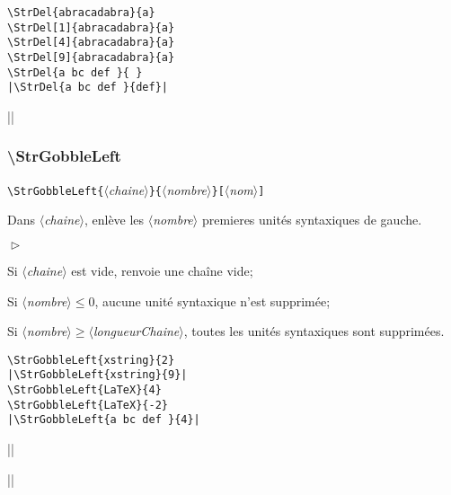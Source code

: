 \documentclass[a4paper,10pt]{article}
\newcommand\argu[1]{$\langle$\textit{#1}$\rangle$}
\newcommand\ARGU[1]{\texttt{\color{black}\{}\argu{#1}\texttt{\color{black}\}}}
\newcommand\arguC[1]{\texttt{\color{black}[}\argu{#1}\texttt{\color{black}]}}
\newenvironment{Conditions}[1][1cm]%
{\begin{list}%
	{$\vartriangleright$}%
	{\setlength{\leftmargin}{#1}
	 \setlength{\itemsep}{0pt}
	 \setlength{\parsep}{0pt}
	 \setlength{\topsep}{2ptplus3ptminus2pt}
	}}%
{\end{list}}
\newcommand\US{unité syntaxique\xspace}
\newcommand\USs{unités syntaxiques\xspace}
\newcommand\styleexemple{\small\vskip4pt}
\newcommand\verbinline{\lstinline[basicstyle=\normalsize\ttfamily]}
\begin{document}
\begin{minipage}[t]{0.65\linewidth}
\begin{lstlisting}
\StrDel{abracadabra}{a}
\StrDel[1]{abracadabra}{a}
\StrDel[4]{abracadabra}{a}
\StrDel[9]{abracadabra}{a}
\StrDel{a bc def }{ }
|\StrDel{a bc def }{def}|
\end{lstlisting}%
\end{minipage}\hfill
\begin{minipage}[t]{0.35\linewidth}
	\styleexemple
	\par
	\par
	\par
	\par
	\par
	||
\end{minipage}%

\subsubsection{\ttfamily\textbackslash StrGobbleLeft}
\verbinline|\StrGobbleLeft|\ARGU{chaine}\ARGU{nombre}\arguC{nom}
\smallskip

Dans \argu{chaine}, enlève les \argu{nombre} premieres \USs de gauche.\medskip

\begin{Conditions}
	\item Si \argu{chaine} est vide, renvoie une chaîne vide;
	\item Si \argu{nombre}${}\leqslant0$, aucune \US n'est supprimée;
	\item Si \argu{nombre}${}\geqslant{}$\argu{longueurChaine}, toutes les \USs sont supprimées.
\end{Conditions}

\begin{minipage}[t]{0.65\linewidth}
\begin{lstlisting}
\StrGobbleLeft{xstring}{2}
|\StrGobbleLeft{xstring}{9}|
\StrGobbleLeft{LaTeX}{4}
\StrGobbleLeft{LaTeX}{-2}
|\StrGobbleLeft{a bc def }{4}|
\end{lstlisting}%
\end{minipage}\hfill
\begin{minipage}[t]{0.35\linewidth}
	\styleexemple
	\par
	||\par
	\par
	\par
	||
\end{minipage}%
\end{document}

